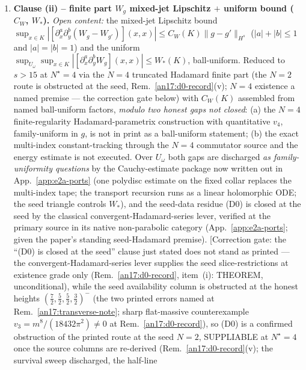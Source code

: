 \begin{enumerate}[label=\textup{(M\arabic*)},leftmargin=*]
  \item\label{item:an17-M1} \textbf{Clause (ii) -- finite part $W_g$
    mixed-jet Lipschitz $+$ uniform bound ($C_W$, $W_*$).}
    \emph{Open content:} the mixed-jet Lipschitz bound
    $\sup_{x\in K}|[\partial_x^a\partial_y^b(W_g-W_{g'})](x,x)|\le
    C_W(K)\|g-g'\|_{H^s}$ ($|a|+|b|\le1$ and $|a|=|b|=1$) and the uniform
    $\sup_{U_\omega}\sup_{x\in K}|[\partial_x^a\partial_y^b W_g](x,x)|\le
    W_*(K)$, ball-uniform.  Reduced to $s>15$ at $N^\star{=}4$ via the
    $N=4$ truncated Hadamard finite part (the $N=2$ route is obstructed
    at the seed, Rem.~\ref{an17:d0-record}(v); $N=4$ existence a named
    premise --- the correction gate below) with $C_W(K)$ assembled from
    named ball-uniform factors, \emph{modulo two honest gaps not closed}:
    (a) the $N=4$ finite-regularity Hadamard-parametrix construction with
    quantitative $v_4$, family-uniform in $g$, is not in print as a
    ball-uniform statement; (b) the exact multi-index constant-tracking
    through the $N=4$ commutator source and the energy estimate is not
    executed.
    Over $U_\omega$ both gaps are discharged \emph{as
    family-uniformity questions} by the Cauchy-estimate package now
    written out in App.~\ref{app:e2a-ports} (one polydisc estimate on
    the fixed collar replaces the multi-index tape; the transport
    recursion runs as a linear holomorphic ODE; the seed triangle
    controls $W_*$), and the seed-data residue (D0) is closed at the
    seed by the classical convergent-Hadamard-series lever, verified
    at the primary source in its native non-parabolic category
    (App.~\ref{app:e2a-ports}; given the paper's standing
    seed-Hadamard premise). \textup{[Correction gate: the ``(D0) is closed at the
    seed'' clause just stated does not stand as printed --- the
    convergent-Hadamard-series lever supplies the seed slice-restrictions at
    existence grade only (Rem.~\ref{an17:d0-record}, item~(i): THEOREM,
    unconditional), while the seed availability column is obstructed at the
    honest heights $(\tfrac72,\tfrac52,\tfrac52,\tfrac32)^-$ (the two printed
    errors named at Rem.~\ref{an17:transverse-note}; sharp flat-massive
    counterexample $v_3=m^8/(18432\pi^2)\neq0$ at Rem.~\ref{an17:d0-record}),
    so (D0) is a confirmed obstruction of the printed route at the seed $N{=}2$,
    SUPPLIABLE at $N^\star{=}4$ once the source columns are re-derived
    (Rem.~\ref{an17:d0-record}(v); the survival sweep discharged, the half-line
}
\end{enumerate}
